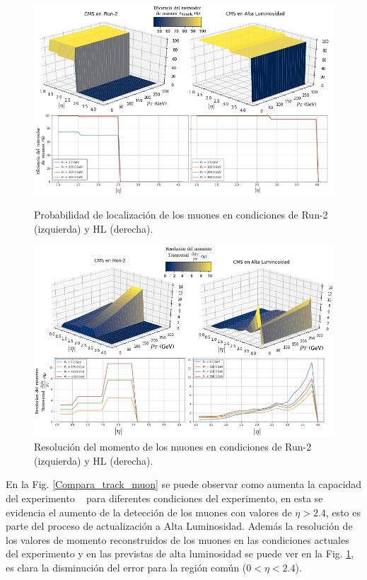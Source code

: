 \begin{figure}[!t]
\centering
\includegraphics[width=.90\textwidth]{Cap2/imagenes/Tracking_of_Muon.png}
\caption{Probabilidad de localización de los muones en condiciones de Run-2 (izquierda) y HL (derecha).}
\label{Compara_track_muon}
\includegraphics[width=.90\textwidth]{Cap2/imagenes/Momentum_resolution_of_Muon.png}
\caption{Resolución del momento de los muones en condiciones de Run-2 (izquierda) y HL (derecha).}
\label{Compara_sol_muon}
\end{figure}
En la Fig. \ref{Compara_track_muon} se puede observar como aumenta la capacidad del experimento \CMS ~ para diferentes condiciones del experimento, en esta se evidencia el aumento de la detección de los muones con valores de $\eta > 2.4$, esto es parte del proceso de actualización a Alta Luminosidad. Además la resolución de los valores de momento reconstruidos de los muones en las condiciones actuales del experimento y en las previstas de alta luminosidad se puede ver en la Fig. \ref{Compara_sol_muon}, es clara la disminución del error para la región común ($0<\eta < 2.4$).

